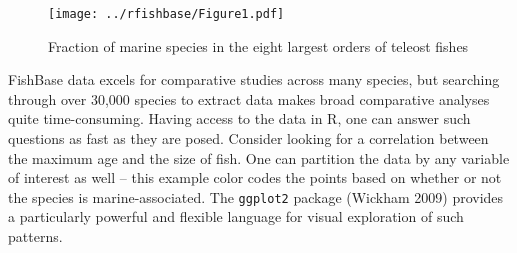 \begin{Shaded}
\end{Shaded}
\begin{Shaded}
\begin{Highlighting}[]
\NormalTok{() + }
  \NormalTok{(}\NormalTok{,}\NormalTok{) +  }
  \NormalTok{(}\NormalTok{(}\NormalTok{, }\NormalTok{, }\NormalTok{)) + }
  \NormalTok{(}\NormalTok{(), }\NormalTok{(}\NormalTok{,}\NormalTok{), }\NormalTok{)) +}
  \NormalTok{(}\NormalTok{(}\NormalTok{, }\NormalTok{)) + }
  \NormalTok{(}\NormalTok{) + }\NormalTok{(}\NormalTok{)}
\end{Highlighting}
\end{Shaded}
\begin{figure}[htbp]
\centering
\texttt{[image: ../rfishbase/Figure1.pdf]}
\caption{Fraction of marine species in the eight largest orders of
teleost fishes}
\end{figure}

FishBase data excels for comparative studies across many species, but
searching through over 30,000 species to extract data makes broad
comparative analyses quite time-consuming. Having access to the data in
R, one can answer such questions as fast as they are posed. Consider
looking for a correlation between the maximum age and the size of fish.
One can partition the data by any variable of interest as well -- this
example color codes the points based on whether or not the species is
marine-associated. The \texttt{ggplot2} package (Wickham 2009) provides
a particularly powerful and flexible language for visual exploration of
such patterns.

